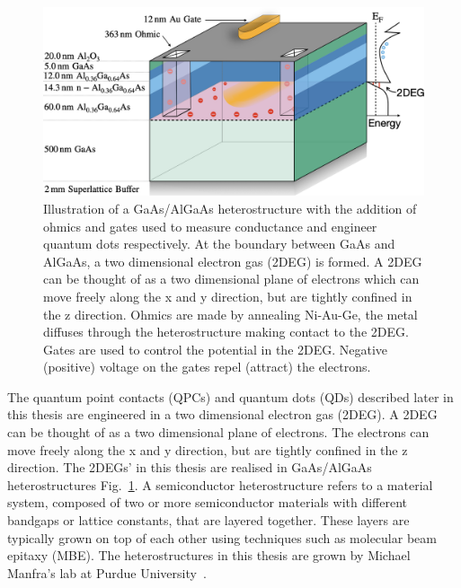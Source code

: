 \begin{figure}[!htb]
  \begin{center}
    \includegraphics[width=1.0\textwidth]{figures/ch1/crop_FiguresMaster.002.png}
    \caption[Two dimensional electron gas in a GaAs/AlGaAs heterostructure]{\label{fig:ch1/2deg} 
    Illustration of a GaAs/AlGaAs heterostructure with the addition of ohmics and gates used to measure conductance and engineer quantum dots respectively. At the boundary between GaAs and AlGaAs, a two dimensional electron gas (2DEG) is formed. A 2DEG can be thought of as a two dimensional plane of electrons which can move freely along the x and y direction, but are tightly confined in the z direction. Ohmics are made by annealing Ni-Au-Ge, the metal diffuses through the heterostructure making contact to the 2DEG. Gates are used to control the potential in the 2DEG. Negative (positive) voltage on the gates repel (attract) the electrons.
      }
  \end{center}
\end{figure}



The quantum point contacts (QPCs) and quantum dots (QDs) described later in this thesis are engineered in a two dimensional electron gas (2DEG). A 2DEG can be thought of as a two dimensional plane of electrons. The electrons can move freely along the x and y direction, but are tightly confined in the z direction. The 2DEGs' in this thesis are realised in GaAs/AlGaAs heterostructures Fig.~\ref{fig:ch1/2deg}. A semiconductor heterostructure refers to a material system, composed of two or more semiconductor materials with different bandgaps or lattice constants, that are layered together. These layers are typically grown on top of each other using techniques such as molecular beam epitaxy (MBE). The heterostructures in this thesis are grown by Michael Manfra's lab at Purdue University~\cite{manfra_high_quality}. 

